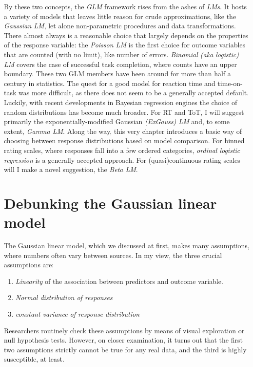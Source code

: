 \documentclass[]{svmono}
\providecommand{\tightlist}{%
  \setlength{\itemsep}{0pt}\setlength{\parskip}{0pt}}
\begin{document}
By these two concepts, the \emph{GLM} framework rises from the ashes of
\emph{LMs}. It hosts a variety of models that leaves little reason for
crude approximations, like the \emph{Gaussian LM}, let alone
non-parametric procedures and data transformations. There almost always
is a reasonable choice that largely depends on the properties of the
response variable: the \emph{Poisson LM} is the first choice for outcome
variables that are counted (with no limit), like number of errors.
\emph{Binomial (aka logistic) LM} covers the case of successful task
completion, where counts have an upper boundary. These two GLM members
have been around for more than half a century in statistics. The quest
for a good model for reaction time and time-on-task was more difficult,
as there does not seem to be a generally accepted default. Luckily, with
recent developments in Bayesian regression engines the choice of random
distributions has become much broader. For RT and ToT, I will suggest
primarily the exponentially-modified Gaussian \emph{(ExGauss) LM} and,
to some extent, \emph{Gamma LM}. Along the way, this very chapter
introduces a basic way of choosing between response distributions based
on model comparison. For binned rating scales, where responses fall into
a few ordered categories, \emph{ordinal logistic regression} is a
generally accepted approach. For (quasi)continuous rating scales will I
make a novel suggestion, the \emph{Beta LM}.

\section{Debunking the Gaussian linear
model}\label{debunking-the-gaussian-linear-model}

The Gaussian linear model, which we discussed at first, makes many
assumptions, where numbers often vary between sources. In my view, the
three crucial assumptions are:

\begin{enumerate}
\def\labelenumi{\arabic{enumi}.}
\tightlist
\item
  \emph{Linearity} of the association between predictors and outcome
  variable.
\item
  \emph{Normal distribution of responses}
\item
  \emph{constant variance of response distribution}
\end{enumerate}

Researchers routinely check these assumptions by means of visual
exploration or null hypothesis tests. However, on closer examination, it
turns out that the first two assumptions strictly cannot be true for any
real data, and the third is highly susceptible, at least.
\end{document}
